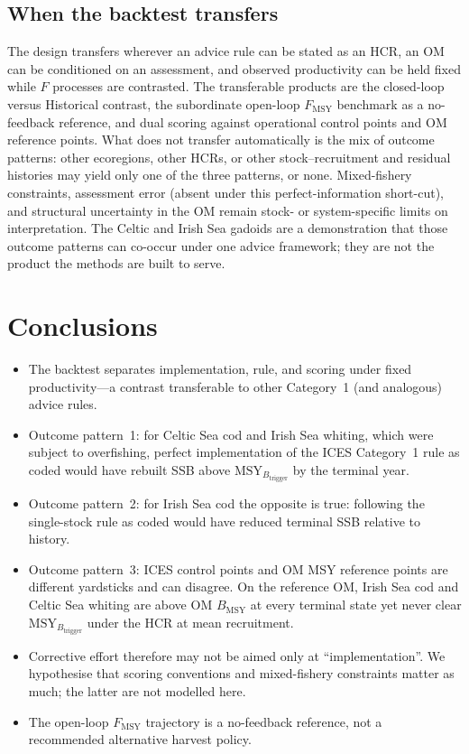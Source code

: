 \documentclass[11pt,a4paper]{article}
\newcommand{\Fmsy}{F_{\mathrm{MSY}}}
\newcommand{\Btrig}{\mathrm{MSY}_{B_{\mathrm{trigger}}}}
\newcommand{\Bmsy}{B_{\mathrm{MSY}}}
\begin{document}
\subsection{When the backtest transfers}
The design transfers wherever an advice rule can be stated as an HCR,
an OM can be conditioned on an assessment, and observed productivity can
be held fixed while $F$ processes are contrasted. The transferable
products are the closed-loop versus Historical contrast, the subordinate
open-loop $\Fmsy$ benchmark as a no-feedback reference, and dual scoring
against operational control points and OM reference points. What does
not transfer automatically is the mix of outcome patterns: other
ecoregions, other HCRs, or other stock--recruitment and residual
histories may yield only one of the three patterns, or none.
Mixed-fishery constraints, assessment error (absent under this
perfect-information short-cut), and structural uncertainty in the OM
remain stock- or system-specific limits on interpretation. The Celtic
and Irish Sea gadoids are a demonstration that those outcome patterns
can co-occur under one advice framework; they are not the product the
methods are built to serve.

\section{Conclusions}
\label{sec:conclusions}

\begin{itemize}
  \item The backtest separates implementation, rule, and scoring under
        fixed productivity---a contrast transferable to other
        Category~1 (and analogous) advice rules.
  \item Outcome pattern~1: for Celtic Sea cod and Irish Sea whiting,
        which were subject to overfishing, perfect implementation of the
        ICES Category~1 rule as coded would have rebuilt SSB above
        $\Btrig$ by the terminal year.
  \item Outcome pattern~2: for Irish Sea cod the opposite is true:
        following the single-stock rule as coded would have reduced
        terminal SSB relative to history.
  \item Outcome pattern~3: ICES control points and OM MSY reference
        points are different yardsticks and can disagree. On the
        reference OM, Irish Sea cod and Celtic Sea whiting are above OM
        $\Bmsy$ at every terminal state yet never clear $\Btrig$ under
        the HCR at mean recruitment.
  \item Corrective effort therefore may not be aimed only at
        ``implementation''. We hypothesise that scoring conventions and
        mixed-fishery constraints matter as much; the latter are not
        modelled here.
  \item The open-loop $\Fmsy$ trajectory is a no-feedback reference, not
        a recommended alternative harvest policy.
\end{itemize}
\end{document}
